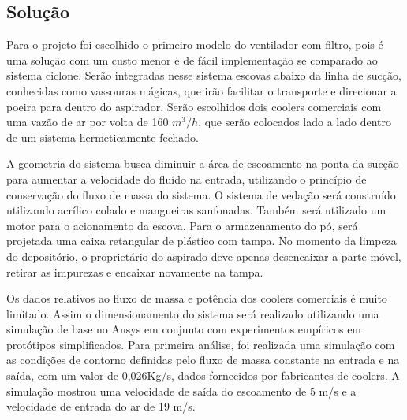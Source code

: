 	\subsection{Solução} %
	\label{sub:solução}
		
		Para o projeto foi escolhido o primeiro modelo do ventilador com filtro, pois é uma solução com um custo menor e de fácil implementação se comparado ao sistema ciclone. Serão integradas nesse sistema escovas abaixo da linha de sucção, conhecidas como vassouras mágicas, que irão facilitar o transporte e direcionar a poeira para dentro do aspirador. Serão escolhidos dois coolers comerciais com uma vazão de ar por volta de 160 $m^3/h$, que serão colocados lado a lado dentro de um sistema hermeticamente fechado. 

		A geometria do sistema busca diminuir a área de escoamento na ponta da sucção para aumentar a velocidade do fluído na entrada, utilizando o princípio de conservação do fluxo de massa do sistema. O sistema de vedação será construído utilizando acrílico colado e mangueiras sanfonadas. Também será utilizado um motor para o acionamento da escova. Para o armazenamento do pó, será projetada uma caixa retangular de plástico com tampa. No momento da limpeza do depositório, o proprietário do aspirado deve apenas desencaixar a parte móvel, retirar as impurezas e encaixar novamente na tampa.

		Os dados relativos ao fluxo de massa e potência dos coolers comerciais é muito limitado. Assim o dimensionamento do sistema será realizado utilizando uma simulação de base no Ansys em conjunto com experimentos empíricos em protótipos simplificados. Para primeira análise, foi realizada uma simulação com as condições de contorno definidas pelo fluxo de massa constante na entrada e na saída, com um valor de 0,026Kg/s, dados fornecidos por fabricantes de coolers. A simulação mostrou uma velocidade de saída do escoamento de 5 m/s e a velocidade de entrada do ar de 19 m/s.



